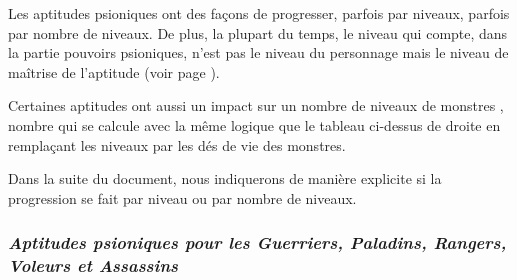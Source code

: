 \bigskip

Les aptitudes psioniques ont des façons de progresser, parfois par niveaux, parfois par nombre de niveaux. De plus, la plupart du temps, le niveau qui compte, dans la partie pouvoirs psioniques, n'est pas le niveau du personnage mais le niveau de maîtrise de l'aptitude (voir page \pageref{niveau-maitrise}).

\bigskip

Certaines aptitudes ont aussi un impact sur un \og nombre de niveaux de monstres \fg{}, nombre qui se calcule avec la même logique que le tableau ci-dessus de droite en remplaçant les niveaux par les dés de vie des monstres.

\bigskip

Dans la suite du document, nous indiquerons de manière explicite si la progression se fait par niveau ou par nombre de niveaux.

\newpage
\subsubsection*{\textit{Aptitudes psioniques pour les Guerriers, Paladins, Rangers, Voleurs et Assassins}}

